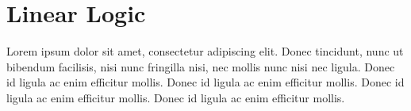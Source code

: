 \section{Linear Logic}
\label{sec:linear-logic}

Lorem ipsum dolor sit amet, consectetur adipiscing elit. Donec
tincidunt, nunc ut bibendum facilisis, nisi nunc fringilla nisi, nec
mollis nunc nisi nec ligula. Donec id ligula ac enim efficitur
mollis. Donec id ligula ac enim efficitur mollis. Donec id ligula ac
enim efficitur mollis. Donec id ligula ac enim efficitur mollis.